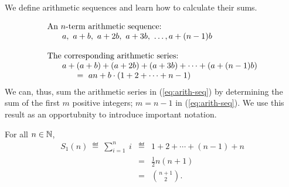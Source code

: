 \documentclass{article}
\begin{document}
We define arithmetic sequences and learn how to calculate their sums.

\begin{equation}
\label{eq:arith-seq}
\begin{array}{l}
\mbox{An $n$-term arithmetic sequence:} \\
\hspace*{.25in}a, \ a+b, \ a+2b, \ a+3b, \ \ldots, a+(n-1)b \\
\\
\mbox{The corresponding arithmetic series:} \\
\hspace*{.25in}a + (a+b) + (a+2b) + (a+3b) + \cdots + (a+(n-1)b) \\
\hspace*{.5in} = \
an + b \cdot (1 + 2 + \cdots + n-1)
\end{array}
\end{equation}
We can, thus, sum the arithmetic series in (\ref{eq:arith-seq}) by
determining the sum of the first $m$ positive integers; $m = n-1$ in
(\ref{eq:arith-seq}).  We use this result as an opportubnity to
introduce important notation.


\label{thm:sum-first-integers-Gauss}
For all $n \in \mathbb{N}$,
\begin{eqnarray}
\nonumber
S_1(n) \ \eqdef \ \sum_{i=1}^n \ i
  & \eqdef &
 1 + 2 + \cdots + (n-1) + n \\
\label{eq:sum-1-to-n}
  & = & \frac{1}{2} n (n+1) \\
\nonumber
  & = & {{n+1}  \choose 2}.
\end{eqnarray}
\end{document}
